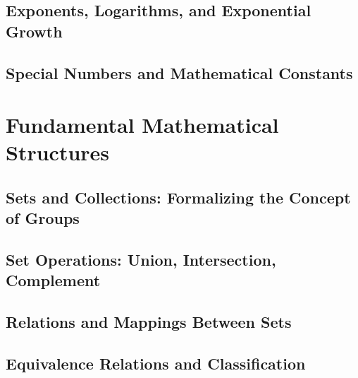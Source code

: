 \documentclass[12pt, oneside, openany]{book}
\let\oldchapter\chapter
\renewcommand{\chapter}{
	\cleardoublepage
	\thispagestyle{chapter}
	\oldchapter
}
\begin{document}
\section{Exponents, Logarithms, and Exponential Growth}

\section{Special Numbers and Mathematical Constants}


\chapter{Fundamental Mathematical Structures}

\section{Sets and Collections: Formalizing the Concept of Groups}

\section{Set Operations: Union, Intersection, Complement}

\section{Relations and Mappings Between Sets}

\section{Equivalence Relations and Classification}
\end{document}
